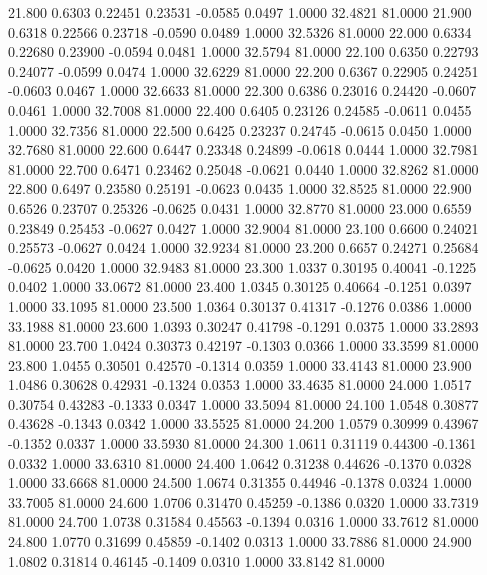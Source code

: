   21.800   0.6303   0.22451   0.23531  -0.0585   0.0497   1.0000  32.4821  81.0000
  21.900   0.6318   0.22566   0.23718  -0.0590   0.0489   1.0000  32.5326  81.0000
  22.000   0.6334   0.22680   0.23900  -0.0594   0.0481   1.0000  32.5794  81.0000
  22.100   0.6350   0.22793   0.24077  -0.0599   0.0474   1.0000  32.6229  81.0000
  22.200   0.6367   0.22905   0.24251  -0.0603   0.0467   1.0000  32.6633  81.0000
  22.300   0.6386   0.23016   0.24420  -0.0607   0.0461   1.0000  32.7008  81.0000
  22.400   0.6405   0.23126   0.24585  -0.0611   0.0455   1.0000  32.7356  81.0000
  22.500   0.6425   0.23237   0.24745  -0.0615   0.0450   1.0000  32.7680  81.0000
  22.600   0.6447   0.23348   0.24899  -0.0618   0.0444   1.0000  32.7981  81.0000
  22.700   0.6471   0.23462   0.25048  -0.0621   0.0440   1.0000  32.8262  81.0000
  22.800   0.6497   0.23580   0.25191  -0.0623   0.0435   1.0000  32.8525  81.0000
  22.900   0.6526   0.23707   0.25326  -0.0625   0.0431   1.0000  32.8770  81.0000
  23.000   0.6559   0.23849   0.25453  -0.0627   0.0427   1.0000  32.9004  81.0000
  23.100   0.6600   0.24021   0.25573  -0.0627   0.0424   1.0000  32.9234  81.0000
  23.200   0.6657   0.24271   0.25684  -0.0625   0.0420   1.0000  32.9483  81.0000
  23.300   1.0337   0.30195   0.40041  -0.1225   0.0402   1.0000  33.0672  81.0000
  23.400   1.0345   0.30125   0.40664  -0.1251   0.0397   1.0000  33.1095  81.0000
  23.500   1.0364   0.30137   0.41317  -0.1276   0.0386   1.0000  33.1988  81.0000
  23.600   1.0393   0.30247   0.41798  -0.1291   0.0375   1.0000  33.2893  81.0000
  23.700   1.0424   0.30373   0.42197  -0.1303   0.0366   1.0000  33.3599  81.0000
  23.800   1.0455   0.30501   0.42570  -0.1314   0.0359   1.0000  33.4143  81.0000
  23.900   1.0486   0.30628   0.42931  -0.1324   0.0353   1.0000  33.4635  81.0000
  24.000   1.0517   0.30754   0.43283  -0.1333   0.0347   1.0000  33.5094  81.0000
  24.100   1.0548   0.30877   0.43628  -0.1343   0.0342   1.0000  33.5525  81.0000
  24.200   1.0579   0.30999   0.43967  -0.1352   0.0337   1.0000  33.5930  81.0000
  24.300   1.0611   0.31119   0.44300  -0.1361   0.0332   1.0000  33.6310  81.0000
  24.400   1.0642   0.31238   0.44626  -0.1370   0.0328   1.0000  33.6668  81.0000
  24.500   1.0674   0.31355   0.44946  -0.1378   0.0324   1.0000  33.7005  81.0000
  24.600   1.0706   0.31470   0.45259  -0.1386   0.0320   1.0000  33.7319  81.0000
  24.700   1.0738   0.31584   0.45563  -0.1394   0.0316   1.0000  33.7612  81.0000
  24.800   1.0770   0.31699   0.45859  -0.1402   0.0313   1.0000  33.7886  81.0000
  24.900   1.0802   0.31814   0.46145  -0.1409   0.0310   1.0000  33.8142  81.0000
